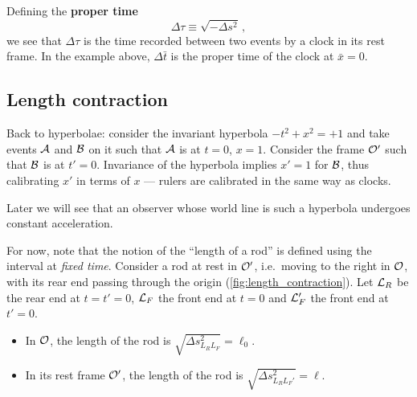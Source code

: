 Defining the \textbf{proper time}
\begin{equation}
    \Delta\tau \equiv \sqrt{-\Delta s^2} \, ,
    \label{eq:proper_time}
\end{equation}
we see that $\Delta\tau$ is the time recorded between two events by a clock in its rest frame.
In the example above, $\Delta\bar{t}$ is the proper time of the clock at $\bar{x} = 0$.

\subsection{Length contraction}
\label{sec:sr_length_contraction}

Back to hyperbolae: consider the invariant hyperbola $-t^2 + x^2 = +1$ and take events $\mathcal{A}$
and $\mathcal{B}$ on it such that $\mathcal{A}$ is at $t = 0$, $x = 1$. Consider the frame $\mathcal{O}'$ such that
$\mathcal{B}$ is at $t' = 0$. Invariance of the hyperbola implies $x' = 1$ for $\mathcal{B}$, thus
calibrating $x'$ in terms of $x$ --- rulers are calibrated in the same way as clocks.

\begin{remark}
    Later we will see that an observer whose world line is such a hyperbola undergoes constant
    acceleration.
\end{remark}

For now, note that the notion of the ``length of a rod'' is defined using the interval at
\emph{fixed time}. Consider a rod at rest in $\mathcal{O}'$, i.e.\ moving to the right in $\mathcal{O}$, with
its rear end passing through the origin (\cref{fig:length_contraction}). Let $\mathcal{L}_R$ be the
rear end at $t = t' = 0$, $\mathcal{L}_F$ the front end at $t = 0$ and $\mathcal{L}_F'$ the front end at
$t' = 0$.
\begin{itemize}[leftmargin=*, nosep]
    \item In $\mathcal{O}$, the length of the rod is $\sqrt{\Delta s^2_{L_R L_F}} = \ell_0$.
    \item In its rest frame $\mathcal{O}'$, the length of the rod is $\sqrt{\Delta s^2_{L_R L_F'}} = \ell$.
\end{itemize}

